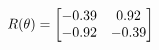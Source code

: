 \documentclass[preview]{standalone}
\begin{document}
\begin{align*}
\special{dvisvgm:raw <g id='unique000'>}R(\theta) = \begin{bmatrix}-0.39 & 0.92\\-0.92 & -0.39\end{bmatrix}\special{dvisvgm:raw </g>}
\end{align*}
\end{document}
